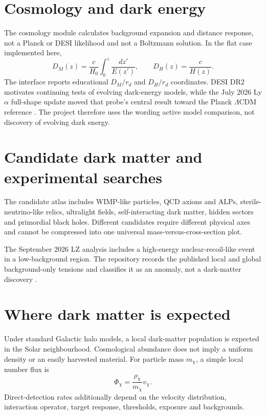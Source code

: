\documentclass[11pt,a4paper]{article}
\begin{document}
\section{Cosmology and dark energy}
The cosmology module calculates background expansion and distance response, not a Planck or DESI likelihood and not a Boltzmann solution. In the flat case implemented here,
\begin{equation}
D_M(z)=\frac{c}{H_0}\int_0^z\frac{dz'}{E(z')},\qquad D_H(z)=\frac{c}{H(z)}.
\end{equation}
The interface reports educational $D_M/r_d$ and $D_H/r_d$ coordinates. DESI DR2 motivates continuing tests of evolving dark-energy models, while the July 2026 Ly$\alpha$ full-shape update moved that probe's central result toward the Planck $\Lambda$CDM reference \parencite{DESI2026}. The project therefore uses the wording active model comparison, not discovery of evolving dark energy.

\section{Candidate dark matter and experimental searches}
The candidate atlas includes WIMP-like particles, QCD axions and ALPs, sterile-neutrino-like relics, ultralight fields, self-interacting dark matter, hidden sectors and primordial black holes. Different candidates require different physical axes and cannot be compressed into one universal mass-versus-cross-section plot.

The September 2026 LZ analysis includes a high-energy nuclear-recoil-like event in a low-background region. The repository records the published local and global background-only tensions and classifies it as an anomaly, not a dark-matter discovery \parencite{LZ2026}.

\section{Where dark matter is expected}
Under standard Galactic halo models, a local dark-matter population is expected in the Solar neighbourhood. Cosmological abundance does not imply a uniform density or an easily harvested material. For particle mass $m_\chi$, a simple local number flux is
\begin{equation}
\Phi_\chi=\frac{\rho_\chi}{m_\chi}v_\chi.
\end{equation}
Direct-detection rates additionally depend on the velocity distribution, interaction operator, target response, thresholds, exposure and backgrounds.
\end{document}
